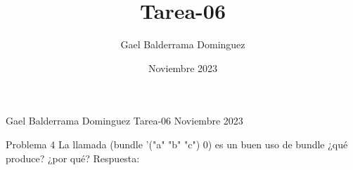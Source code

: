 \documentclass{article}
\author{Gael Balderrama Dominguez}
\title{Tarea-06}
\date{Noviembre 2023}
\begin{document}
\begin{center}
    Gael Balderrama Dominguez \linebreak
    Tarea-06 \linebreak
    Noviembre 2023 \linebreak
\end{center}
    Problema 4 \newline
    La llamada (bundle '("a" "b" "c") 0) es un buen uso de bundle ¿qué produce? ¿por qué? \newline
    Respuesta:
\end{document}
